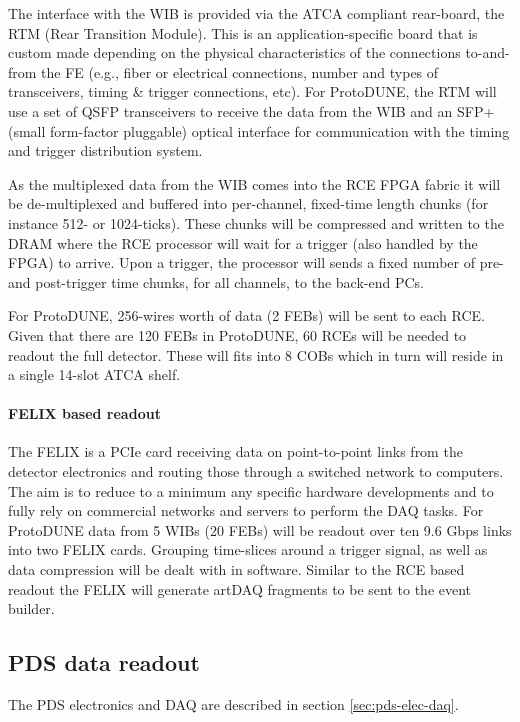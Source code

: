 The interface with the WIB is provided via the ATCA compliant rear-board, the RTM (Rear Transition Module).  
This is an application-specific board
that is custom made depending on the physical characteristics of the
connections to-and-from the FE (e.g., fiber or electrical connections,
number and types of transceivers, timing \& trigger connections, etc).
For ProtoDUNE, the RTM will use a set of QSFP transceivers to receive
the data from the WIB and an SFP+ (small form-factor pluggable)
 optical interface for communication
with the timing and trigger distribution system.

As the multiplexed data from the WIB comes into the RCE FPGA fabric
it will be de-multiplexed and buffered into per-channel, fixed-time
length chunks (for instance 512- or 1024-ticks).  These chunks will be
compressed and written to the DRAM where the RCE processor will wait
for a trigger (also handled by the FPGA) to arrive.  Upon a trigger, the
processor will sends a fixed number of pre- and post-trigger time chunks,
for all channels, to the back-end PCs.  

For ProtoDUNE, 256-wires worth of data (2 FEBs) will be sent to each RCE.
Given that there are 120 FEBs in ProtoDUNE, 60 RCEs will be needed to
readout the full detector.  These will fits into 8 COBs which in turn
will reside in a single 14-slot ATCA shelf.

\paragraph{FELIX based readout}
The FELIX is a PCIe card receiving data on point-to-point links from
the detector electronics and routing those through a switched network
to computers.  The aim is to reduce to a minimum any specific hardware
developments and to fully rely on commercial networks and servers to
perform the DAQ tasks.  For ProtoDUNE data from 5 WIBs (20 FEBs) will
be readout over ten 9.6 Gbps links into two FELIX cards.  Grouping
time-slices around a trigger signal, as well as data compression will be
dealt with in software. Similar to the RCE based readout the FELIX will
generate artDAQ fragments to be sent to the event builder.


\subsection{PDS data readout}

The PDS electronics and DAQ are described in section \ref{sec:pds-elec-daq}.

